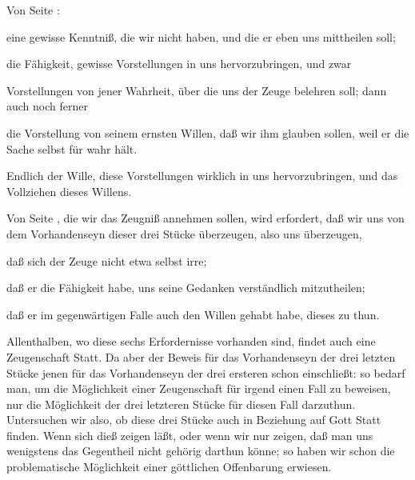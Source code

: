 \begin{aufza}
\item Von Seite :
\begin{aufzb}
\item eine gewisse Kenntniß, die wir nicht haben, und die er eben uns mittheilen soll;
\item die Fähigkeit, gewisse Vorstellungen in uns hervorzubringen, und zwar
\begin{aufzc}
\item Vorstellungen von jener Wahrheit, über die uns der Zeuge belehren soll; dann auch noch ferner
\item die Vorstellung von seinem ernsten Willen, daß wir ihm glauben sollen, weil er die Sache selbst für wahr hält.
\end{aufzc}
\item Endlich der Wille, diese Vorstellungen wirklich in uns hervorzubringen, und das Vollziehen dieses Willens.
\end{aufzb}
\item Von Seite , die wir das Zeugniß annehmen sollen, wird erfordert, daß wir uns von dem Vorhandenseyn dieser drei Stücke überzeugen, also uns überzeugen,
\begin{aufzb}
\item daß sich der Zeuge nicht etwa selbst irre;
\item daß er die Fähigkeit habe, uns seine Gedanken verständlich mitzutheilen;
\item daß er im gegenwärtigen Falle auch den Willen gehabt habe, dieses zu thun.
\end{aufzb}\par
Allenthalben, wo diese sechs Erfordernisse vorhanden sind, findet auch eine Zeugenschaft Statt. Da aber der Beweis für das Vorhandenseyn der drei letzten Stücke jenen für das Vorhandenseyn der drei ersteren schon einschließt: so bedarf man, um die Möglichkeit einer Zeugenschaft für irgend einen Fall zu beweisen, nur die Möglichkeit der drei letzteren Stücke für diesen Fall darzuthun. Untersuchen wir also, ob diese drei Stücke auch in Beziehung auf Gott Statt finden. Wenn sich dieß zeigen läßt, oder wenn wir nur zeigen, daß man uns wenigstens das Gegentheil nicht gehörig darthun könne; so haben wir schon die problematische Möglichkeit einer göttlichen Offenbarung erwiesen.~
\end{aufza}

